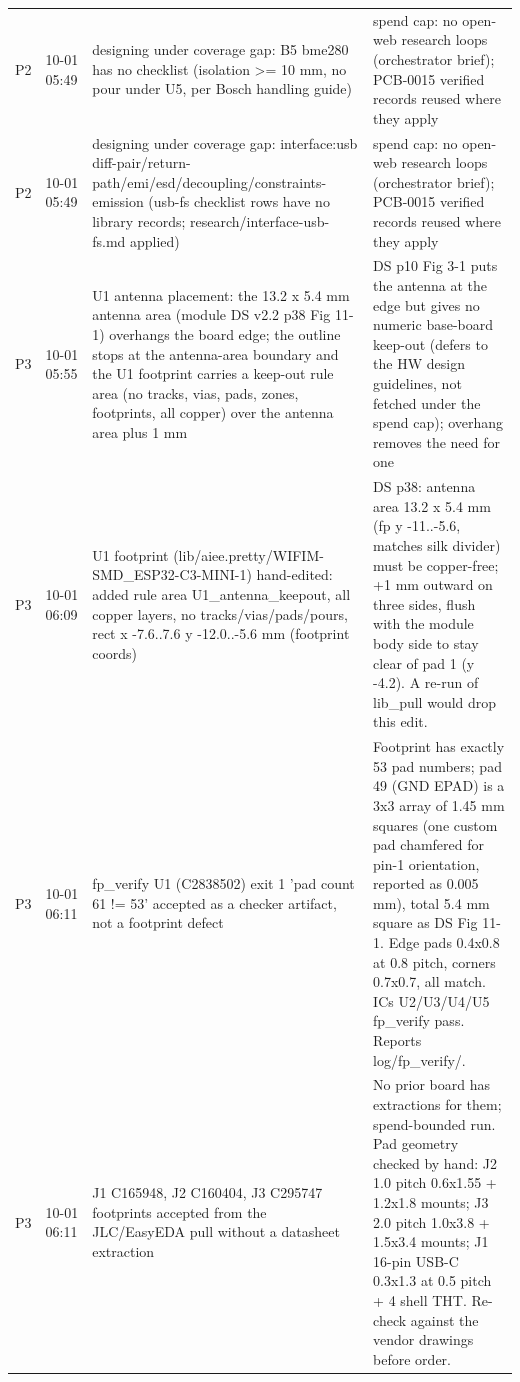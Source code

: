 \documentclass[11pt]{article}
\begin{document}
{\begin{longtable}{lp{1.6cm}p{6.2cm}p{6.2cm}}
P2 & 10-01 05:49 & designing under coverage gap: B5 bme280 has no checklist (isolation \textgreater{}= 10 mm, no pour under U5, per Bosch handling guide) & spend cap: no open-web research loops (orchestrator brief); PCB-0015 verified records reused where they apply \\
P2 & 10-01 05:49 & designing under coverage gap: interface:usb diff-pair/return-path/emi/esd/decoupling/constraints-emission (usb-fs checklist rows have no library records; research/interface-usb-fs.md applied) & spend cap: no open-web research loops (orchestrator brief); PCB-0015 verified records reused where they apply \\
P3 & 10-01 05:55 & U1 antenna placement: the 13.2 x 5.4 mm antenna area (module DS v2.2 p38 Fig 11-1) overhangs the board edge; the outline stops at the antenna-area boundary and the U1 footprint carries a keep-out rule area (no tracks, vias, pads, zones, footprints, all copper) over the antenna area plus 1 mm & DS p10 Fig 3-1 puts the antenna at the edge but gives no numeric base-board keep-out (defers to the HW design guidelines, not fetched under the spend cap); overhang removes the need for one \\
P3 & 10-01 06:09 & U1 footprint (lib/aiee.pretty/WIFIM-SMD\_ESP32-C3-MINI-1) hand-edited: added rule area U1\_antenna\_keepout, all copper layers, no tracks/vias/pads/pours, rect x -7.6..7.6 y -12.0..-5.6 mm (footprint coords) & DS p38: antenna area 13.2 x 5.4 mm (fp y -11..-5.6, matches silk divider) must be copper-free; +1 mm outward on three sides, flush with the module body side to stay clear of pad 1 (y -4.2). A re-run of lib\_pull would drop this edit. \\
P3 & 10-01 06:11 & fp\_verify U1 (C2838502) exit 1 'pad count 61 != 53' accepted as a checker artifact, not a footprint defect & Footprint has exactly 53 pad numbers; pad 49 (GND EPAD) is a 3x3 array of 1.45 mm squares (one custom pad chamfered for pin-1 orientation, reported as 0.005 mm), total 5.4 mm square as DS Fig 11-1. Edge pads 0.4x0.8 at 0.8 pitch, corners 0.7x0.7, all match. ICs U2/U3/U4/U5 fp\_verify pass. Reports log/fp\_verify/. \\
P3 & 10-01 06:11 & J1 C165948, J2 C160404, J3 C295747 footprints accepted from the JLC/EasyEDA pull without a datasheet extraction & No prior board has extractions for them; spend-bounded run. Pad geometry checked by hand: J2 1.0 pitch 0.6x1.55 + 1.2x1.8 mounts; J3 2.0 pitch 1.0x3.8 + 1.5x3.4 mounts; J1 16-pin USB-C 0.3x1.3 at 0.5 pitch + 4 shell THT. Re-check against the vendor drawings before order. \\
\hline
\end{longtable}
}
\end{document}
